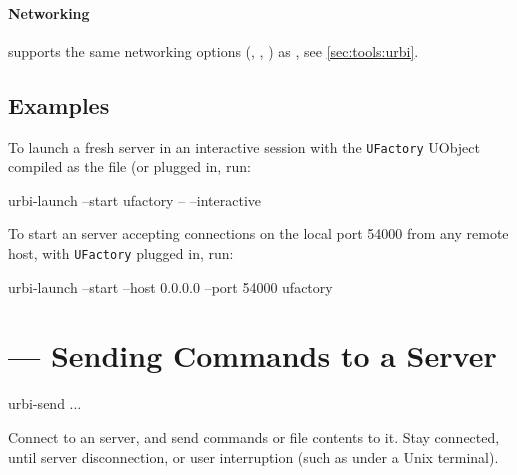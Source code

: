 \paragraph{Networking}
 supports the same networking options
(, , ) as
, see \autoref{sec:tools:urbi}.

\subsection{Examples}

To launch a fresh server in an interactive session with the
\lstinline|UFactory| UObject compiled as the file 
(or  plugged in, run:

\begin{shell}
urbi-launch --start ufactory -- --interactive
\end{shell}

To start an \urbi server accepting connections on the local port 54000
from any remote host, with \lstinline|UFactory| plugged in, run:

\begin{shell}
urbi-launch --start --host 0.0.0.0 --port 54000 ufactory
\end{shell}


\section{ --- Sending \us Commands to a Server}
\label{sec:tools:urbi-send}

\begin{shell}
urbi-send ...
\end{shell}

Connect to an \urbi server, and send commands or file contents to it.
Stay connected, until server disconnection, or user interruption (such
as  under a Unix terminal).

